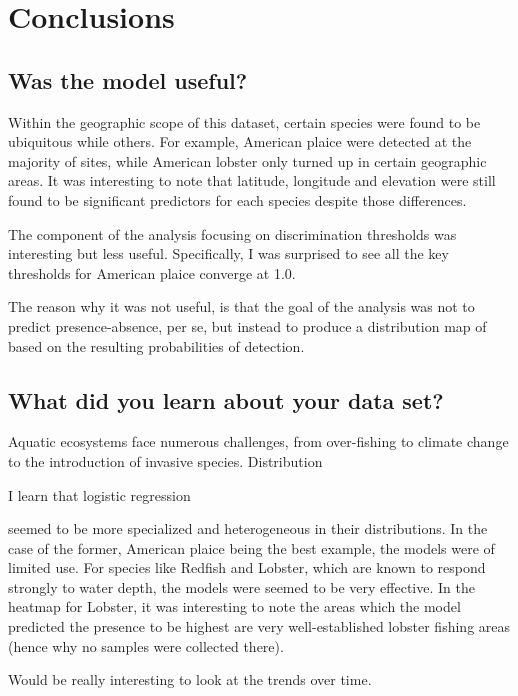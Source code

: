 \section{Conclusions}

\subsection{Was the model useful?}

Within the geographic scope of this dataset, certain species were found to be ubiquitous while others.
For example, American plaice were detected at the majority of sites, while American lobster only turned up in certain
geographic areas.
It was interesting to note that latitude, longitude and elevation were still found to be significant predictors for each
species despite those differences.

The component of the analysis focusing on discrimination thresholds was interesting but less useful.
Specifically, I was surprised to see all the key thresholds for American plaice converge at 1.0.

The reason why it was not useful, is that the goal of the analysis was not to predict presence-absence, per se, but instead
to produce a distribution map of based on the resulting probabilities of detection.


\subsection{What did you learn about your data set?}

Aquatic ecosystems face numerous challenges, from over-fishing to climate change to the introduction of invasive species.
Distribution



I learn that logistic regression

seemed to be more specialized and heterogeneous in their distributions.
In the case of the former, American plaice being the best example, the models were of limited use.
For species like Redfish and Lobster, which are known to respond strongly to water depth, the models were seemed to be very effective.
In the heatmap for Lobster, it was interesting to note the areas which the model predicted the presence to be highest are
very well-established lobster fishing areas (hence why no samples were collected there).






Would be really interesting to look at the trends over time.